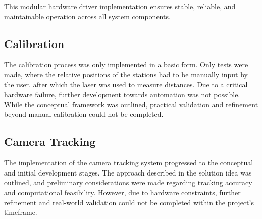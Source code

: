 This modular hardware driver implementation ensures stable, reliable, and maintainable operation across all system components.


\subsection{Calibration}

The calibration process was only implemented in a basic form. Only tests were made, where the relative positions of the stations had to be manually input by the user, after which the laser was used to measure distances. Due to a critical hardware failure, further development towards automation was not possible. While the conceptual framework was outlined, practical validation and refinement beyond manual calibration could not be completed.

\subsection{Camera Tracking}

The implementation of the camera tracking system progressed to the conceptual and initial development stages. The approach described in the solution idea was outlined, and preliminary considerations were made regarding tracking accuracy and computational feasibility. However, due to hardware constraints, further refinement and real-world validation could not be completed within the project's timeframe.

